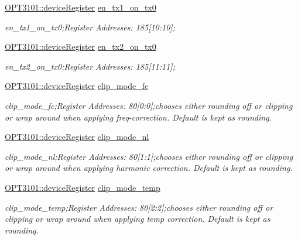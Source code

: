 \begin{DoxyCompactItemize}
\mbox{\hyperlink{class_o_p_t3101_1_1device_register}{O\+P\+T3101\+::device\+Register}} \mbox{\hyperlink{class_o_p_t3101_1_1registers_a72ee56b2c4fc0d6b04e2edfbf036f8ec}{en\+\_\+tx1\+\_\+on\+\_\+tx0}}
\begin{DoxyCompactList}\small\item\em en\+\_\+tx1\+\_\+on\+\_\+tx0;Register Addresses\+: 185\mbox{[}10\+:10\mbox{]}; \end{DoxyCompactList}\item 
\mbox{\hyperlink{class_o_p_t3101_1_1device_register}{O\+P\+T3101\+::device\+Register}} \mbox{\hyperlink{class_o_p_t3101_1_1registers_abf81e8f737e0288f11211ecf48e698b7}{en\+\_\+tx2\+\_\+on\+\_\+tx0}}
\begin{DoxyCompactList}\small\item\em en\+\_\+tx2\+\_\+on\+\_\+tx0;Register Addresses\+: 185\mbox{[}11\+:11\mbox{]}; \end{DoxyCompactList}\item 
\mbox{\hyperlink{class_o_p_t3101_1_1device_register}{O\+P\+T3101\+::device\+Register}} \mbox{\hyperlink{class_o_p_t3101_1_1registers_a7f492976fddcfa840372b5e531f7cf86}{clip\+\_\+mode\+\_\+fc}}
\begin{DoxyCompactList}\small\item\em clip\+\_\+mode\+\_\+fc;Register Addresses\+: 80\mbox{[}0\+:0\mbox{]};chooses either rounding off or clipping or wrap around when applying freq-\/correction. Default is kept as rounding. \end{DoxyCompactList}\item 
\mbox{\hyperlink{class_o_p_t3101_1_1device_register}{O\+P\+T3101\+::device\+Register}} \mbox{\hyperlink{class_o_p_t3101_1_1registers_a50e6410737d9b479ceed94b6521b566d}{clip\+\_\+mode\+\_\+nl}}
\begin{DoxyCompactList}\small\item\em clip\+\_\+mode\+\_\+nl;Register Addresses\+: 80\mbox{[}1\+:1\mbox{]};chooses either rounding off or clipping or wrap around when applying harmonic correction. Default is kept as rounding. \end{DoxyCompactList}\item 
\mbox{\hyperlink{class_o_p_t3101_1_1device_register}{O\+P\+T3101\+::device\+Register}} \mbox{\hyperlink{class_o_p_t3101_1_1registers_abe6e94cb9cc2611cca3f47a29447b92c}{clip\+\_\+mode\+\_\+temp}}
\begin{DoxyCompactList}\small\item\em clip\+\_\+mode\+\_\+temp;Register Addresses\+: 80\mbox{[}2\+:2\mbox{]};chooses either rounding off or clipping or wrap around when applying temp correction. Default is kept as rounding. \end{DoxyCompactList}\item 

\end{DoxyCompactItemize}
